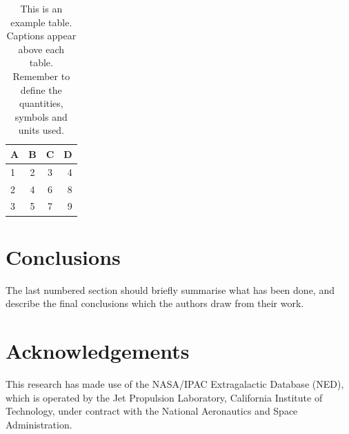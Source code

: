 \documentclass[a4paper,fleqn,usenatbib]{mnras}
\begin{document}
\begin{table}
	\centering
	\caption{This is an example table. Captions appear above each table.
	Remember to define the quantities, symbols and units used.}
	\label{tab:example_table}
	\begin{tabular}{lccr} %
		\hline
		A & B & C & D\\
		\hline
		1 & 2 & 3 & 4\\
		2 & 4 & 6 & 8\\
		3 & 5 & 7 & 9\\
		\hline
	\end{tabular}
\end{table}


\section{Conclusions}

The last numbered section should briefly summarise what has been done, and describe
the final conclusions which the authors draw from their work.

\section*{Acknowledgements}

This research has made use of the NASA/IPAC Extragalactic Database (NED), which is operated by the Jet Propulsion Laboratory, California Institute of Technology, under contract with the National Aeronautics and Space Administration.







\end{document}
